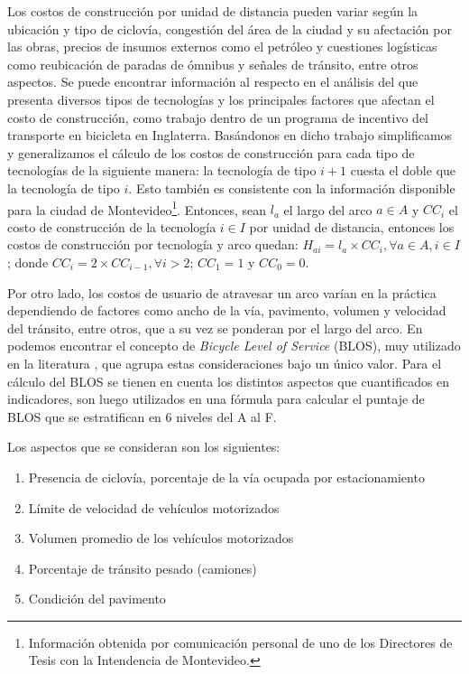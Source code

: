 Los costos de construcción por unidad de distancia pueden variar según la ubicación y tipo de ciclovía, congestión del área de la ciudad y su afectación por las obras, precios de insumos externos como el petróleo y cuestiones logísticas como reubicación de paradas de ómnibus y señales de tránsito, entre otros aspectos. Se puede encontrar información al respecto en el análisis del \textcite{typicalcostsofcylcing} que presenta diversos tipos de tecnologías y los principales factores que afectan el costo de construcción, como trabajo dentro de un programa de incentivo del transporte en bicicleta en Inglaterra. Basándonos en dicho trabajo simplificamos y generalizamos el cálculo de los costos de construcción para cada tipo de tecnologías de la siguiente manera: la tecnología de tipo $i + 1$ cuesta el doble que la tecnología de tipo $i$. Esto también es consistente con la información disponible para la ciudad de Montevideo\footnote{Información obtenida por comunicación personal de uno de los Directores de Tesis con la Intendencia de Montevideo.}. Entonces, sean $l_a$ el largo del arco $a \in A$ y $CC_i$ el costo de construcción de la tecnología $i \in I$ por unidad de distancia, entonces los costos de construcción por tecnología y arco quedan: $H_{ai} = l_a \times CC_i, \forall a \in A, i \in I$; donde $CC_i = 2 \times CC_{i-1}, \forall i > 2$; $CC_1 = 1$ y $CC_0 = 0$.

Por otro lado, los costos de usuario de atravesar un arco varían en la práctica dependiendo de factores como ancho de la vía, pavimento, volumen y velocidad del tránsito, entre otros, que a su vez se ponderan por el largo del arco. En \textcite{blos2007} podemos encontrar el concepto de {\it Bicycle Level of Service} (BLOS), muy utilizado en la literatura \parencite{Zhu2019, Liu2019}, que agrupa estas consideraciones bajo un único valor. Para el cálculo del BLOS se tienen en cuenta los distintos aspectos que cuantificados en indicadores, son luego utilizados en una fórmula para calcular el puntaje de BLOS que se estratifican en 6 niveles del A al F.

Los aspectos que se consideran son los siguientes:

\begin{enumerate}
  \item{Presencia de ciclovía, porcentaje de la vía ocupada por estacionamiento}
  \item{Límite de velocidad de vehículos motorizados}
  \item{Volumen promedio de los vehículos motorizados}
  \item{Porcentaje de tránsito pesado (camiones)}
  \item{Condición del pavimento}
\end{enumerate}

